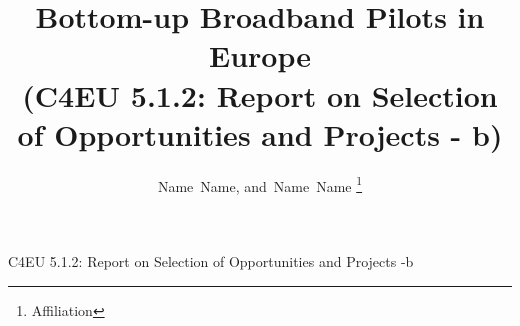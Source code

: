 \documentclass[draftclsnofoot,12pt,journal,onecolumn]{IEEEtran}
\begin{document}
%
\title{Bottom-up Broadband Pilots in Europe \\ (C4EU 5.1.2: Report on Selection of Opportunities and Projects - b)}
%
%
%

\author{
	Name~Name, %
    and~Name~Name%
\thanks{
Affiliation
}
}


% 
%



%
{C4EU 5.1.2: Report on Selection of Opportunities and Projects -b}
% 
\end{document}
